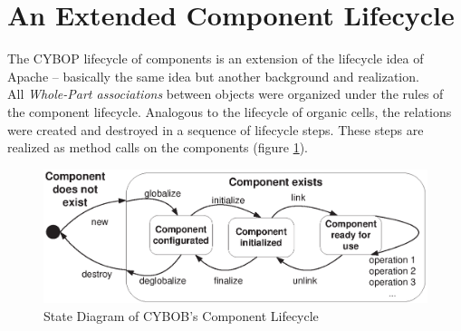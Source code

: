 %
%
%
%
%
%
%

\section{An Extended Component Lifecycle}
\label{an_extended_component_lifecycle_heading}

The CYBOP lifecycle of components is an extension of the lifecycle idea of Apache
-- basically the same idea but another background and realization.\\
All \emph{Whole-Part associations} between objects were organized under the rules
of the component lifecycle. Analogous to the lifecycle of organic cells, the
relations were created and destroyed in a sequence of lifecycle steps. These
steps are realized as method calls on the components (figure
\ref{component_lifecycle_figure}).

\begin{figure}[ht]
    \begin{center}
       \includegraphics[scale=0.4]{eps/lebenszyklusEng.eps}
       \caption{State Diagram of CYBOB's Component Lifecycle}
       \label{component_lifecycle_figure}
    \end{center}
\end{figure}

